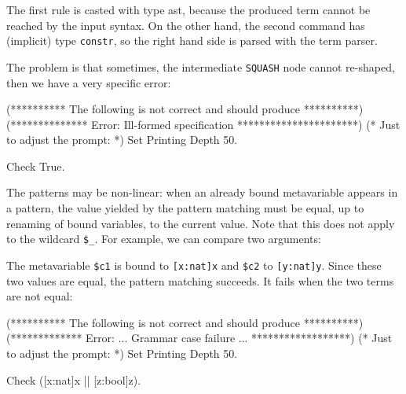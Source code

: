 
The first rule is casted with type ast, because the produced term
cannot be reached by the input syntax. On the other hand, the second
command has (implicit) type \verb+constr+, so the right hand side is
parsed with the term parser.

\noindent The problem is that sometimes, the intermediate {\tt SQUASH}
node cannot re-shaped, then we have a very specific error:

\begin{coq_eval}
(********** The following is not correct and should produce **********)
(************** Error: Ill-formed specification **********************)
(* Just to adjust the prompt: *) Set Printing Depth 50.
\end{coq_eval}
\begin{coq_example}
Check {True}.
\end{coq_example}



The patterns may be non-linear: when an already bound metavariable
appears in a pattern, the value yielded by the pattern matching must
be equal, up to renaming of bound variables, to the current
value. Note that this does not apply to the wildcard \verb+$_+. For
example, we can compare two arguments:


\noindent The metavariable \verb+$c1+ is bound to \verb+[x:nat]x+ and
\verb+$c2+ to \verb+[y:nat]y+. Since these two values are equal, the
pattern matching succeeds. It fails when the two terms are not equal:

\begin{coq_eval}
(********** The following is not correct and should produce **********)
(************* Error: ...  Grammar case failure ... ******************)
(* Just to adjust the prompt: *) Set Printing Depth 50.
\end{coq_eval}
\begin{coq_example}
Check ([x:nat]x || [z:bool]z).
\end{coq_example}



